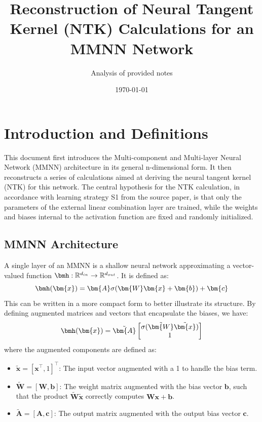 \documentclass{article}
\title{Reconstruction of Neural Tangent Kernel (NTK) Calculations for an MMNN Network}
\author{Analysis of provided notes}
\date{\today}
\begin{document}
\maketitle

\section{Introduction and Definitions}
This document first introduces the Multi-component and Multi-layer Neural Network (MMNN) architecture in its general n-dimensional form. It then reconstructs a series of calculations aimed at deriving the neural tangent kernel (NTK) for this network. The central hypothesis for the NTK calculation, in accordance with learning strategy S1 from the source paper, is that only the parameters of the external linear combination layer are trained, while the weights and biases internal to the activation function are fixed and randomly initialized.

\subsection{MMNN Architecture}
A single layer of an MMNN is a shallow neural network approximating a vector-valued function $\bmh:\mathbb{R}^{d_{in}} \to \mathbb{R}^{d_{out}}$. It is defined as:
\begin{equation}
    \bmh(\bm{x}) = \bm{A} \sigma(\bm{W}\bm{x} + \bm{b}) + \bm{c}
\end{equation}
This can be written in a more compact form to better illustrate its structure. By defining augmented matrices and vectors that encapsulate the biases, we have:
\begin{equation}
    \bmh(\bm{x}) = \tilde{\bm{A}}
    \begin{bmatrix}
        \sigma(\tilde{\bm{W}}\tilde{\bm{x}}) \\
        1
    \end{bmatrix}
\end{equation}
where the augmented components are defined as:
\begin{itemize}
    \item $\tilde{\bm{x}} = [\bm{x}^{\top}, 1]^{\top}$: The input vector augmented with a 1 to handle the bias term.
    \item $\tilde{\bm{W}} = [\bm{W}, \bm{b}]$: The weight matrix augmented with the bias vector $\bm{b}$, such that the product $\tilde{\bm{W}}\tilde{\bm{x}}$ correctly computes $\bm{W}\bm{x} + \bm{b}$.
    \item $\tilde{\bm{A}} = [\bm{A}, \bm{c}]$: The output matrix augmented with the output bias vector $\bm{c}$.
\end{itemize}
\end{document}
